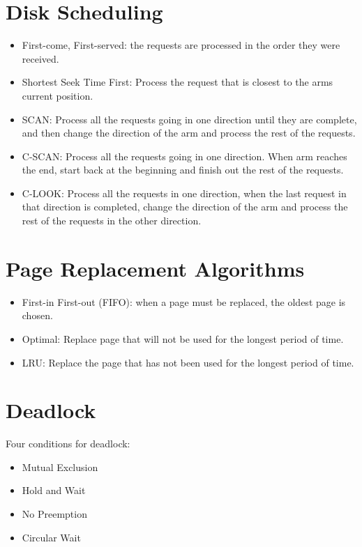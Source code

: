 \documentclass{article}
\begin{document}
\begin{multicols}{2}
    \section*{Disk Scheduling}

    \begin{itemize}
      \item First-come, First-served: the requests are processed in the order they were received.
      \item Shortest Seek Time First: Process the request that is closest to the arms current
        position.
      \item SCAN: Process all the requests going in one direction until they are complete, and then
        change the direction of the arm and process the rest of the requests.
      \item C-SCAN: Process all the requests going in one direction. When arm reaches the end, start
        back at the beginning and finish out the rest of the requests.
      \item C-LOOK: Process all the requests in one direction, when the last request in that direction
        is completed, change the direction of the arm and process the rest of the requests in the
        other direction.
    \end{itemize}

    \section*{Page Replacement Algorithms}

    \begin{itemize}
      \item First-in First-out (FIFO): when a page must be replaced, the oldest page is chosen.
      \item Optimal: Replace page that will not be used for the longest period of time.
      \item LRU: Replace the page that has not been used for the longest period of time.
    \end{itemize}

    \section*{Deadlock}

    Four conditions for deadlock:
    \begin{itemize}
      \item Mutual Exclusion
      \item Hold and Wait
      \item No Preemption
      \item Circular Wait
    \end{itemize}


\end{multicols}
\end{document}
